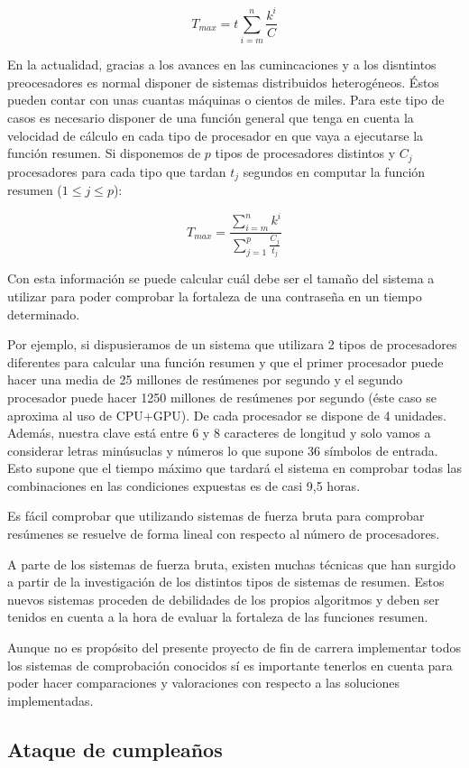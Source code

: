 $$ T_{max}=t\sum^n_{i=m}\frac{k^i}{C} $$

En la actualidad, gracias a los avances en las cumincaciones y a los disntintos preocesadores es normal disponer de sistemas distribuidos heterogéneos. Éstos pueden contar con unas cuantas máquinas o cientos de miles. Para este tipo de casos es necesario disponer de una función general que tenga en cuenta la velocidad de cálculo en cada tipo de procesador en que vaya a ejecutarse la función resumen. Si disponemos de $p$ tipos de procesadores distintos y $C_j$ procesadores para cada tipo que tardan $t_j$ segundos en computar la función resumen ($1 \leq j \leq p$):

$$ T_{max}=\frac{\sum^n_{i=m}k^i}{\sum^p_{j=1}\frac{C_j}{t_j}}$$
 
Con esta información  se puede calcular cuál debe ser el tamaño del sistema a utilizar para poder comprobar la fortaleza de una contraseña en un tiempo determinado.

Por ejemplo, si dispusieramos de un sistema que utilizara 2 tipos de procesadores diferentes para calcular una función resumen y que el primer procesador puede hacer una media de 25 millones de resúmenes por segundo y el segundo procesador puede hacer 1250 millones de resúmenes por segundo (éste caso se aproxima al uso de CPU+GPU). De cada procesador se dispone de 4 unidades. Además, nuestra clave está entre 6 y 8 caracteres de longitud y solo vamos a considerar letras minúsuclas y números lo que supone 36 símbolos de entrada. Esto supone que el tiempo máximo que tardará el sistema en comprobar todas las combinaciones en las condiciones expuestas es de casi 9,5 horas.

Es fácil comprobar que utilizando sistemas de fuerza bruta para comprobar resúmenes se resuelve de forma lineal con respecto al número de procesadores.

A parte de los sistemas de fuerza bruta, existen muchas técnicas que han surgido a partir de la investigación de los distintos tipos de sistemas de resumen. Estos nuevos sistemas proceden de debilidades de los propios algoritmos y deben ser tenidos en cuenta a la hora de evaluar la fortaleza de las funciones resumen.

Aunque no es propósito del presente proyecto de fin de carrera implementar todos los sistemas de comprobación conocidos sí es importante tenerlos en cuenta para poder hacer comparaciones y valoraciones con respecto a las soluciones implementadas.

\subsection{Ataque de cumpleaños}


